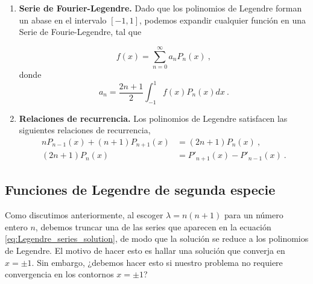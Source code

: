 \begin{propiedad}
\begin{enumerate}
        \item \textbf{Serie de Fourier-Legendre.} Dado que los polinomios de Legendre forman un abase en el intervalo $[-1,1]$, podemos expandir cualquier función en una Serie de Fourie-Legendre, tal que
    
        \begin{equation}
            f(x) = \sum_{n=0}^\infty a_n P_n(x) \ ,
        \end{equation}
        donde 
        \begin{equation}
            a_n = \frac{2n+1}{2} \int_{-1}^1 f(x) P_n(x) dx \ .
        \end{equation}
         
        \item \textbf{Relaciones de recurrencia.} Los polinomios de Legendre satisfacen las siguientes relaciones de recurrencia,
        \begin{align}
            n P_{n-1}(x) + (n+1) P_{n+1}(x) & = (2n+1) P_n(x) \ , \\
            (2n+1) P_n(x) & = P'_{n+1}(x) - P'_{n-1}(x) \ .
        \end{align}    
    \end{enumerate}
\end{propiedad}

\subsection{Funciones de Legendre de segunda especie}

Como discutimos anteriormente, al escoger $\lambda = n(n+1)$ para un número entero $n$, debemos truncar una de las series que aparecen en la ecuación \eqref{eq:Legendre_series_solution}, de modo que la solución se reduce a los polinomios de Legendre. El motivo de hacer esto es hallar una solución que converja en $x = \pm 1$. Sin embargo, ¿debemos hacer esto si nuestro problema no requiere convergencia en los contornos $x = \pm 1$?

